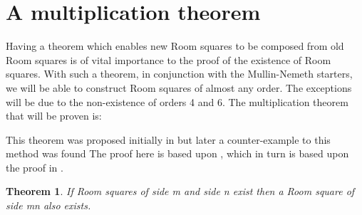 \documentclass[
  11pt,
  a4paper]{book}\usepackage[]{graphicx}\usepackage[]{xcolor}
\newtheorem{theorem}{Theorem}
\newcounter{example}
\begin{document}
\section{A multiplication theorem}

Having a theorem which enables new Room squares to be
composed from old Room squares is of vital importance to the
proof of the existence of Room squares. With such a theorem,
in conjunction with the Mullin-Nemeth starters, we will be
able to construct Room squares of almost any order.  The
exceptions will be due to the non-existence of orders 4 and
6. The multiplication theorem that will be proven is:

This theorem was proposed initially in
\cite{bruckWhatLoop1963}
but later a
counter-example to this method was found
\cite{mullinCounterexampleDirectProduct1969}
The proof
here is based upon
\cite{andersonCombinatorialDesignsConstruction1990},
which in turn is based upon the proof in
\cite{stantonMultiplicationTheoremRoom1972a}.

\begin{theorem}
\label{thm:multiply}
If Room squares of side m and side n exist then a Room
square of side mn also exists.
\end{theorem}
\end{document}
